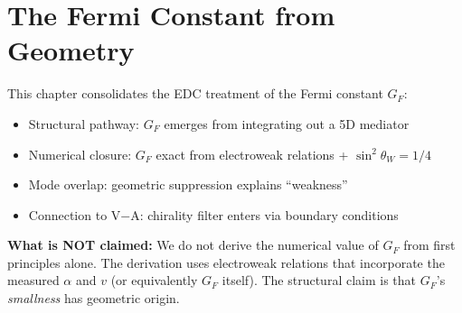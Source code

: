 
\section{The Fermi Constant from Geometry}
\label{sec:ch11_gf}

\begin{tcolorbox}[edcGuardrail, title=\textbf{Epistemic Status}]
This chapter consolidates the EDC treatment of the Fermi constant $G_F$:
\begin{itemize}[nosep]
    \item Structural pathway: $G_F$ emerges from integrating out a 5D mediator \tagDc{}
    \item Numerical closure: $G_F$ exact from electroweak relations + $\sin^2\theta_W = 1/4$ \tagDc{}
    \item Mode overlap: geometric suppression explains ``weakness'' \tagP{}
    \item Connection to V$-$A: chirality filter enters via boundary conditions \tagDc{}
\end{itemize}
\textbf{What is NOT claimed:} We do not derive the numerical value of $G_F$
from first principles alone. The derivation uses electroweak relations that
incorporate the measured $\alpha$ and $v$ (or equivalently $G_F$ itself).
The structural claim is that $G_F$'s \emph{smallness} has geometric origin.
\end{tcolorbox}


